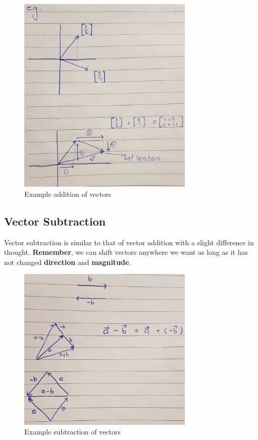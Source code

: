 \documentclass{article}
\begin{document}
\begin{figure}[H]
    \centering
    \includegraphics[width=0.75\textwidth, height=0.75\textwidth]{la_6.png}
    \caption{Example addition of vectors}
    \label{fig6}
\end{figure}

\newpage

\begin{center}
    \section{Vector Subtraction}
\end{center}

Vector subtraction is similar to that of vector addition with a slight difference in thought. \textbf{Remember}, we can shift vectors anywhere we want as long as it has not changed \textbf{direction} and \textbf{magnitude}.

\begin{figure}[H]
    \centering
    \includegraphics[width=0.75\textwidth, height=0.75\textwidth]{la_7.png}
    \caption{Example subtraction of vectors}
    \label{fig7}
\end{figure}
\end{document}
